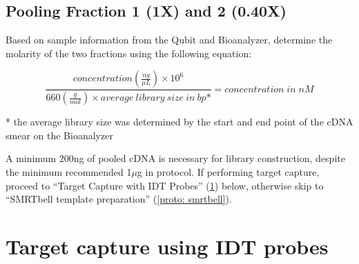 \subsection{Pooling Fraction 1 (1X) and 2 (0.40X)}
Based on sample information from the Qubit and Bioanalyzer, determine the molarity of the two fractions using the following equation: 

\begin{equation}
	\frac{concentration(\frac{ng}{\mu L})\times 10^6}{660(\frac{g}{mol}) \times average\:library\:size\:in\:bp\mbox{*}} = concentration\;in\; nM
\end{equation}
\begin{adjustwidth}{1.8em}{1.8em}
* the average library size was determined by the start and end point of the cDNA smear on the Bioanalyzer
\end{adjustwidth}

A minimum 200ng of pooled cDNA is necessary for library construction, despite the minimum recommended 1$\mu$g in protocol. If performing target capture, proceed to “Target Capture with IDT Probes” (\cref{proto: targetcapture}) below, otherwise skip to “SMRTbell template preparation” (\cref{proto: smrtbell}). 

\section{Target capture using IDT probes} 
\label{proto: targetcapture}

